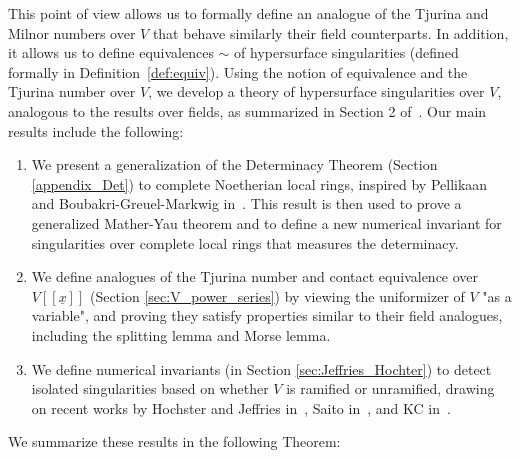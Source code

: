 \documentclass{article}
\numberwithin{theorem}{section}
\begin{document}
This point of view allows us to formally define an analogue of the Tjurina and Milnor numbers over $V$ that behave similarly their field counterparts.  In addition, it allows us to define equivalences $\sim$ of hypersurface singularities (defined formally in Definition~\ref{def:equiv}). Using the notion of equivalence and the Tjurina number over $V$, we develop a theory of hypersurface singularities over $V$, analogous to the results over fields, as summarized in Section 2 of~\cite{greuel2007introduction}.  Our main results include the following:
\begin{enumerate}
    \item We present a generalization of the Determinacy Theorem (Section \ref{appendix_Det}) to complete Noetherian local rings, inspired by Pellikaan \cite{pellikaan1988finite} and Boubakri-Greuel-Markwig in~\cite{boubakri2012invariants}. This result is then used to prove a generalized Mather-Yau theorem and to define a new numerical invariant for singularities over complete local rings that measures the determinacy.
    \item We define analogues of the Tjurina number and contact equivalence over $V[[\underline{x}]]$ (Section \ref{sec:V_power_series}) by viewing the uniformizer of $V$ "as a variable", and proving they satisfy properties similar to their field analogues, including the splitting lemma and Morse lemma.
    \item We define numerical invariants (in Section \ref{sec:Jeffries_Hochter}) to detect isolated singularities based on whether $V$ is ramified or unramified, drawing on recent works by Hochster and Jeffries in~\cite{hochster2021jacobian}, Saito in~\cite{saito2022frobenius}, and KC in~\cite{kc2024singular}.
\end{enumerate}

\medskip

We summarize these results in the following Theorem: 
\end{document}
